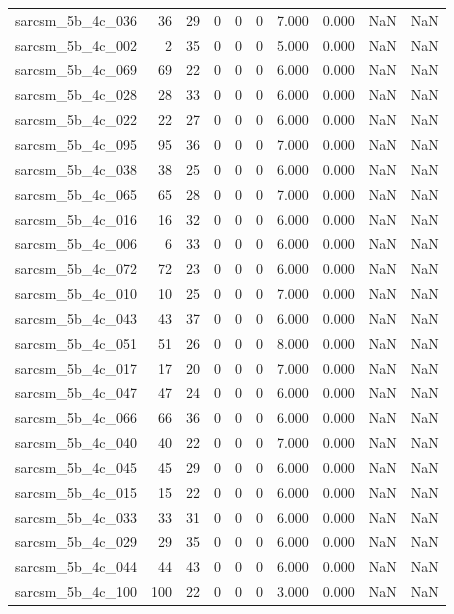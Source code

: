 \documentclass{article}
\begin{document}
\begin{longtable}{lrrrrrrrrr}
sarcsm\_5b\_4c\_036 & 36 & 29 & 0 & 0 & 0 & 7.000 & 0.000 & NaN & NaN \\
sarcsm\_5b\_4c\_002 & 2 & 35 & 0 & 0 & 0 & 5.000 & 0.000 & NaN & NaN \\
sarcsm\_5b\_4c\_069 & 69 & 22 & 0 & 0 & 0 & 6.000 & 0.000 & NaN & NaN \\
sarcsm\_5b\_4c\_028 & 28 & 33 & 0 & 0 & 0 & 6.000 & 0.000 & NaN & NaN \\
sarcsm\_5b\_4c\_022 & 22 & 27 & 0 & 0 & 0 & 6.000 & 0.000 & NaN & NaN \\
sarcsm\_5b\_4c\_095 & 95 & 36 & 0 & 0 & 0 & 7.000 & 0.000 & NaN & NaN \\
sarcsm\_5b\_4c\_038 & 38 & 25 & 0 & 0 & 0 & 6.000 & 0.000 & NaN & NaN \\
sarcsm\_5b\_4c\_065 & 65 & 28 & 0 & 0 & 0 & 7.000 & 0.000 & NaN & NaN \\
sarcsm\_5b\_4c\_016 & 16 & 32 & 0 & 0 & 0 & 6.000 & 0.000 & NaN & NaN \\
sarcsm\_5b\_4c\_006 & 6 & 33 & 0 & 0 & 0 & 6.000 & 0.000 & NaN & NaN \\
sarcsm\_5b\_4c\_072 & 72 & 23 & 0 & 0 & 0 & 6.000 & 0.000 & NaN & NaN \\
sarcsm\_5b\_4c\_010 & 10 & 25 & 0 & 0 & 0 & 7.000 & 0.000 & NaN & NaN \\
sarcsm\_5b\_4c\_043 & 43 & 37 & 0 & 0 & 0 & 6.000 & 0.000 & NaN & NaN \\
sarcsm\_5b\_4c\_051 & 51 & 26 & 0 & 0 & 0 & 8.000 & 0.000 & NaN & NaN \\
sarcsm\_5b\_4c\_017 & 17 & 20 & 0 & 0 & 0 & 7.000 & 0.000 & NaN & NaN \\
sarcsm\_5b\_4c\_047 & 47 & 24 & 0 & 0 & 0 & 6.000 & 0.000 & NaN & NaN \\
sarcsm\_5b\_4c\_066 & 66 & 36 & 0 & 0 & 0 & 6.000 & 0.000 & NaN & NaN \\
sarcsm\_5b\_4c\_040 & 40 & 22 & 0 & 0 & 0 & 7.000 & 0.000 & NaN & NaN \\
sarcsm\_5b\_4c\_045 & 45 & 29 & 0 & 0 & 0 & 6.000 & 0.000 & NaN & NaN \\
sarcsm\_5b\_4c\_015 & 15 & 22 & 0 & 0 & 0 & 6.000 & 0.000 & NaN & NaN \\
sarcsm\_5b\_4c\_033 & 33 & 31 & 0 & 0 & 0 & 6.000 & 0.000 & NaN & NaN \\
sarcsm\_5b\_4c\_029 & 29 & 35 & 0 & 0 & 0 & 6.000 & 0.000 & NaN & NaN \\
sarcsm\_5b\_4c\_044 & 44 & 43 & 0 & 0 & 0 & 6.000 & 0.000 & NaN & NaN \\
sarcsm\_5b\_4c\_100 & 100 & 22 & 0 & 0 & 0 & 3.000 & 0.000 & NaN & NaN \\

\end{longtable}
\end{document}
